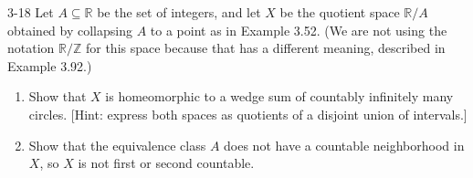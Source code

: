 \begin{problem}{3-18}
Let $A\subseteq \mathbb{R}$ be the set of integers, and let $X$ be the quotient space $\mathbb{R}/A$ obtained by collapsing $A$ to a point as in Example 3.52. (We are not using the notation $\mathbb{R}/\mathbb{Z}$ for this space because that has a different meaning, described in Example 3.92.)
\begin{enumerate}[label={(\alph*)}]
    \item Show that $X$ is homeomorphic to a wedge sum of countably infinitely many circles. [Hint: express both spaces as quotients of a disjoint union
                  of intervals.]
    \item Show that the equivalence class $A$ does not have a countable neighborhood in $X$, so $X$ is not first or second countable.
\end{enumerate}
\end{problem}


